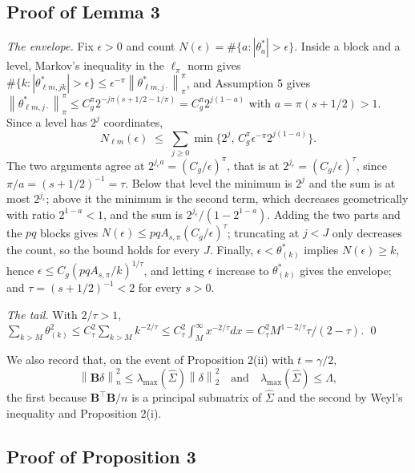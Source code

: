 \documentclass[10pt]{book}
\theoremstyle{definition}
\newcommand{\T}{^{\top}}
\newcommand{\norm}[1]{\left\lVert #1 \right\rVert}
\newcommand{\normn}[1]{\left\lVert #1 \right\rVert_{n}}
\newcommand{\cv}{\ell}
\newcommand{\md}{m}
\newcommand{\lev}{j}
\newcommand{\tsl}{k}
\newcommand{\coefs}[4]{\theta^{*}_{#1#2,#3#4}}
\newcommand{\Gramhat}{\widehat{\Sigma}}
\newcommand{\Bmat}{\mathbf{B}}
\newcommand{\lmaxx}{\lambda_{\max}}
\begin{document}
\subsection*{Proof of Lemma 3}

\emph{The envelope.} Fix $\epsilon>0$ and count
$N(\epsilon) = \#\{a : |\theta^{*}_a| > \epsilon\}$. Inside a block and a
level, Markov's inequality in the $\ell_\pi$ norm gives
$\#\{\tsl : |\coefs{\cv}{\md}{\lev}{\tsl}|>\epsilon\} \le
\epsilon^{-\pi}\norm{\theta^{*}_{\cv\md,\lev\cdot}}^{\pi}_{\pi}$, and
Assumption 5 gives
$\norm{\theta^{*}_{\cv\md,\lev\cdot}}^{\pi}_{\pi} \le
C_g^{\pi}2^{-\lev\pi(s+1/2-1/\pi)} = C_g^{\pi}2^{\lev(1-a)}$ with
$a = \pi(s+1/2)>1$. Since a level has $2^{\lev}$ coordinates,
\[
  N_{\cv\md}(\epsilon) \;\le\; \sum_{\lev\ge0}
  \min\{2^{\lev},\, C_g^{\pi}\epsilon^{-\pi}2^{\lev(1-a)}\} .
\]
The two arguments agree at $2^{\lev_\epsilon a} = (C_g/\epsilon)^{\pi}$, that
is at $2^{\lev_\epsilon} = (C_g/\epsilon)^{\tau}$, since
$\pi/a = (s+1/2)^{-1} = \tau$. Below that level the minimum is $2^{\lev}$ and
the sum is at most $2^{\lev_\epsilon}$; above it the minimum is the second
term, which decreases geometrically with ratio $2^{1-a}<1$, and the sum is
$2^{\lev_\epsilon}/(1-2^{1-a})$. Adding the two parts and the $pq$ blocks
gives $N(\epsilon) \le pqA_{s,\pi}(C_g/\epsilon)^{\tau}$; truncating at
$\lev<J$ only decreases the count, so the bound holds for every $J$. Finally,
$\epsilon < \theta^{*}_{(k)}$ implies $N(\epsilon) \ge k$, hence
$\epsilon \le C_g(pqA_{s,\pi}/k)^{1/\tau}$, and letting $\epsilon$ increase to
$\theta^{*}_{(k)}$ gives the envelope; and $\tau = (s+1/2)^{-1} < 2$ for every
$s>0$.

\emph{The tail.} With $2/\tau>1$,
$\sum_{k>M}\theta^2_{(k)} \le C_\tau^2\sum_{k>M}k^{-2/\tau} \le
C_\tau^2\int_M^{\infty}x^{-2/\tau}dx = C_\tau^2M^{1-2/\tau}\tau/(2-\tau)$.
\qed

We also record that, on the event of Proposition 2(ii) with $t = \gamma/2$,
\begin{equation}
  \label{eq:lmax}
  \normn{\Bmat\delta}^2 \le \lmaxx(\Gramhat)\norm{\delta}_2^2
  \quad\text{and}\quad \lmaxx(\Gramhat) \le \Lambda,
\end{equation}
the first because $\Bmat\T\Bmat/n$ is a principal submatrix of $\Gramhat$ and
the second by Weyl's inequality and Proposition 2(i).

\subsection*{Proof of Proposition 3}
\end{document}
